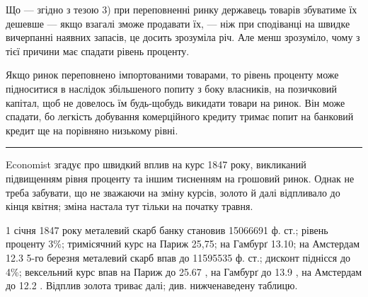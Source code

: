 Що — згідно з тезою 3) при переповненні ринку державець товарів збуватиме
їх дешевше — якщо взагалі зможе продавати їх, — ніж при сподіванці на
швидке вичерпанні наявних запасів, це досить зрозуміла річ. Але менш зрозуміло,
чому з тієї причини має спадати рівень проценту.

Якщо ринок переповнено імпортованими товарами, то рівень проценту може
підноситися в наслідок збільшеного попиту з боку власників, на позичковий
капітал, щоб не довелось їм будь-щобудь викидати товари на ринок. Він може
спадати, бо легкість добування комерційного кредиту тримає попит на банковий
кредит ще на порівняно низькому рівні.

\pfbreak

Economist згадує про швидкий вплив на курс 1847 року, викликаний
підвищенням рівня проценту та іншим тисненням на грошовий ринок. Однак не
треба забувати, що не зважаючи на зміну курсів, золото й далі відпливало
до кінця квітня; зміна настала тут тільки на початку травня.

1 січня 1847 року металевий скарб банку становив 15066691 ф. ст.;
рівень проценту 3\%; тримісячний курс на Париж 25,75; на Гамбурґ 13.10;
на Амстердам 12.3  5-го березня металевий скарб впав до 11595535 ф. ст.;
дисконт піднісся до 4\%; вексельний курс впав на Париж до 25.67 , на Гамбурґ
до 13.9 , на Амстердам до 12.2 . Відплив золота триває далі; див.
нижченаведену таблицю.


